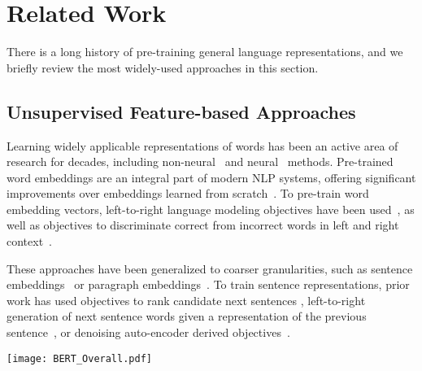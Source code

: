\documentclass[11pt,a4paper]{article}
\begin{document}
\section{Related Work}
There is a long history of pre-training general language representations, and we briefly review the most widely-used approaches in this section.


\subsection{Unsupervised Feature-based Approaches}
Learning widely applicable representations of words has been an active area of research for decades, including non-neural~\cite{brown-etal:1992:_class, ando-zhang:2005, blitzer-mcdonald-pereira:2006:_domain} and neural~\cite{mikolov-etal:2013, pennington-socher-manning:2014:_glove} methods. Pre-trained word embeddings are an integral part of modern NLP systems, offering significant improvements over embeddings learned from scratch~\cite{turian-ratinov-bengio:2010:_word_repres}. To pre-train word embedding vectors, left-to-right language modeling objectives have been used~\cite{minh09}, as well as objectives to  discriminate correct from incorrect words in left and right context~\cite{mikolov-etal:2013}.

These approaches have been generalized to coarser granularities, such as sentence embeddings~\cite{kiros-etal:2015:_skip, logeswaran2018an} or paragraph embeddings~\cite{le-mikolov:2014:_distr}. To train sentence representations, prior work has used objectives to rank candidate next sentences  \cite{DBLP:journals/corr/JerniteBS17, logeswaran2018an},  left-to-right generation of next sentence words given a representation of the previous sentence~\cite{kiros-etal:2015:_skip}, or denoising auto-encoder derived objectives~\cite{hill16}.

\begin{figure*}[t!]
\begin{center}
\texttt{[image: BERT\_Overall.pdf]}
\end{center}
\caption{Overall pre-training and fine-tuning procedures for BERT. Apart from output layers, the same architectures are used in both pre-training and fine-tuning. The same pre-trained model parameters are used to initialize models for different down-stream tasks.  During fine-tuning, all parameters are fine-tuned. {\tt [CLS]} is a special symbol added
in front of every input example, and {\tt [SEP]} is a special separator token (e.g. separating  questions/answers).}
\label{fig:bert_overall}
\end{figure*}
\end{document}
